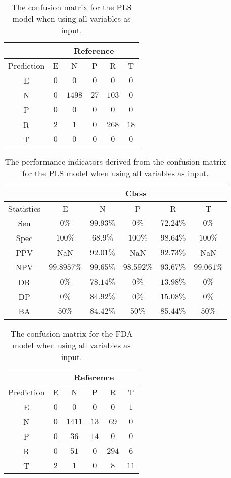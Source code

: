 \begin{table}[!ht]
	\centering
	\begin{tabular}{|c|c|c|c|c|c|}
		\hline
		 & \multicolumn{5}{|c|}{Reference} \\ \hline
		 Prediction & E & N & P & R & T \\ \hline
		 E & $0$ & $0$ & $0$ & $0$ & $0$ \\ \hline
		 N & $0$ & $1498$ & $27$ & $103$ & $0$ \\ \hline
		 P & $0$ & $0$ & $0$ & $0$ & $0$ \\ \hline
		 R & $2$ & $1$ & $0$ & $268$ & $18$ \\ \hline
		 T & $0$ & $0$ & $0$ & $0$ & $0$ \\ \hline
	\end{tabular}
	\caption{The confusion matrix for the PLS model when using all variables as input.}
	\label{tab:cm:all:pls}
\end{table}

\begin{table}[!ht]
	\centering
	\begin{tabular}{|c|c|c|c|c|c|}
		\hline
		 & \multicolumn{5}{c|}{Class} \\ \hline
		Statistics & E & N & P & R & T \\ \hline
		Sen & $0\%$ & $99.93\%$ & $0\%$ & $72.24\%$ & $0\%$ \\ \hline
		Spec & $100\%$ & $68.9\%$ & $100\%$ & $98.64\%$ & $100\%$ \\ \hline
		PPV & NaN & $92.01\%$ & NaN & $92.73\%$ & NaN \\ \hline
		NPV & $99.8957\%$ & $99.65\%$ & $98.592\%$ & $93.67\%$ & $99.061\%$ \\ \hline
		DR & $0\%$ & $78.14\%$ & $0\%$ & $13.98\%$ & $0\%$ \\ \hline
		DP & $0\%$ & $84.92\%$ & $0\%$ & $15.08\%$ & $0\%$ \\ \hline
		BA & $50\%$ & $84.42\%$ & $50\%$ & $85.44\%$ & $50\%$ \\ \hline
	\end{tabular}
	\caption{The performance indicators derived from the confusion matrix for the PLS model when using all variables as input.}
	\label{tab:cs:reverse:all:pls}
\end{table}

\begin{table}[!ht]
	\centering
	\begin{tabular}{|c|c|c|c|c|c|}
		\hline
		 & \multicolumn{5}{|c|}{Reference} \\ \hline
		 Prediction & E & N & P & R & T \\ \hline
		 E & $0$ & $0$ & $0$ & $0$ & $1$ \\ \hline
		 N & $0$ & $1411$ & $13$ & $69$ & $0$ \\ \hline
		 P & $0$ & $36$ & $14$ & $0$ & $0$ \\ \hline
		 R & $0$ & $51$ & $0$ & $294$ & $6$ \\ \hline
		 T & $2$ & $1$ & $0$ & $8$ & $11$ \\ \hline
	\end{tabular}
	\caption{The confusion matrix for the FDA model when using all variables as input.}
	\label{tab:cm:all:fda}
\end{table}

